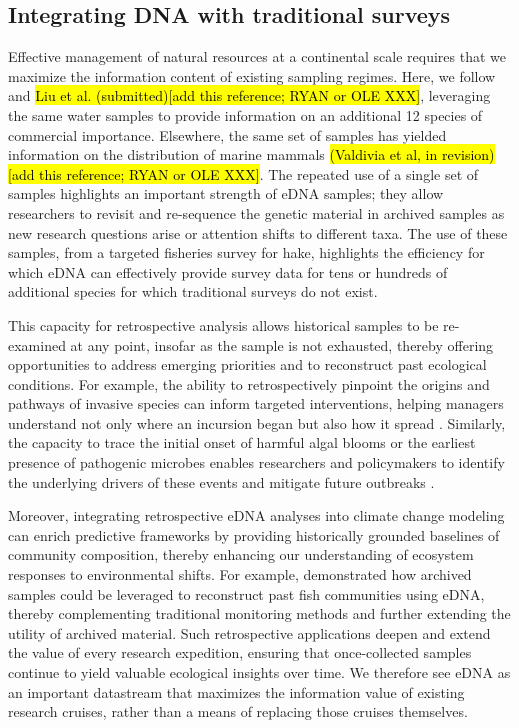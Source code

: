 \documentclass[9pt,twocolumn,twoside]{pnas-new}
\begin{document}
\subsection*{Integrating DNA with traditional surveys}
Effective management of natural resources at a continental scale requires that we maximize the information content of existing sampling regimes. Here, we follow \cite{shelton2022} and \hl{Liu et al. (submitted)[add this reference; RYAN or OLE XXX]}, leveraging the same water samples to provide information on an additional 12 species of commercial importance. Elsewhere, the same set of samples has yielded information on the distribution of marine mammals \hl{(Valdivia et al, in revision)[add this reference; RYAN or OLE XXX]}. The repeated use of a single set of samples highlights an important strength of eDNA samples; they allow researchers to revisit and re-sequence the genetic material in archived samples as new research questions arise or attention shifts to different taxa. The use of these samples, from a targeted fisheries survey for hake, highlights the efficiency for which eDNA can effectively provide survey data for tens or hundreds of additional species for which traditional surveys do not exist. 

This capacity for retrospective analysis allows historical samples to be re-examined at any point, insofar as the sample is not exhausted, thereby offering opportunities to address emerging priorities and to reconstruct past ecological conditions. For example, the ability to retrospectively pinpoint the origins and pathways of invasive species can inform targeted interventions, helping managers understand not only where an incursion began but also how it spread \cite{gilbey2021}. Similarly, the capacity to trace the initial onset of harmful algal blooms or the earliest presence of pathogenic microbes enables researchers and policymakers to identify the underlying drivers of these events and mitigate future outbreaks \cite{shaw2019}. 

Moreover, integrating retrospective eDNA analyses into climate change modeling can enrich predictive frameworks by providing historically grounded baselines of community composition, thereby enhancing our understanding of ecosystem responses to environmental shifts. For example, \cite{diaz2020a} demonstrated how archived samples could be leveraged to reconstruct past fish communities using eDNA, thereby complementing traditional monitoring methods and further extending the utility of archived material. Such retrospective applications deepen and extend the value of every research expedition, ensuring that once-collected samples continue to yield valuable ecological insights over time. We therefore see eDNA as an important datastream that maximizes the information value of existing research cruises, rather than a means of replacing those cruises themselves.
\end{document}
